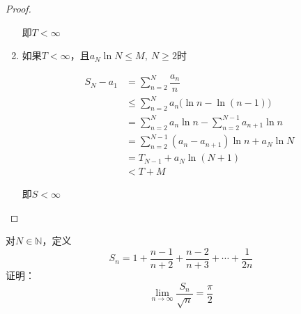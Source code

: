 \begin{proof}
\begin{enumerate}
            即$T < \infty$

        \item 
            如果$T < \infty$，且$a_{N}\ln{N} \leq M,\ N \geq 2$时
                    
            \begin{align*}
                S_N - a_1 &= \sum\limits_{n=2}^{N}{\dfrac{a_n}{n}} \\
                & \leq \sum\limits_{n=2}^{N}{a_n\big(\ln{n} - \ln(n-1)\big)} \\
                & = \sum\limits_{n=2}^{N}{a_n\ln{n}} - \sum\limits_{n=2}^{N-1}{a_{n+1}\ln{n}} \\
                & = \sum\limits_{n=2}^{N-1}{(a_n - a_{n+1})\ln{n}} + a_N\ln{N} \\
                & = T_{N-1} + a_N\ln{(N+1)} \\ 
                & < T + M
            \end{align*}

            即$S < \infty$

     \end{enumerate}

\end{proof}

\begin{proposition}
    
    对$N \in \mathbb{N}$，定义
    $$ S_n = 1 + \dfrac{n-1}{n+2} +\dfrac{n-2}{n+3} + \cdots + \dfrac{1}{2n} $$
    证明：
    $$\lim\limits_{n\to\infty}{\dfrac{S_n}{\sqrt{n}}} = \dfrac{\pi}{2}$$

\end{proposition}

